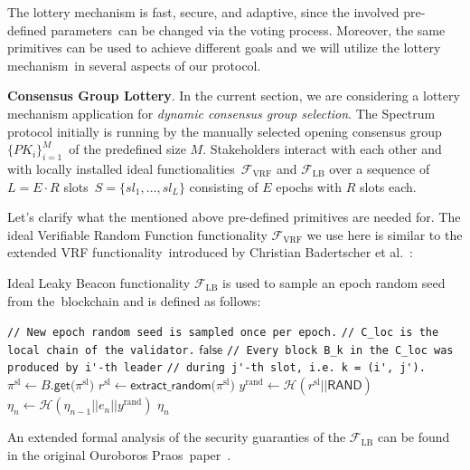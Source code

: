 The lottery mechanism is fast, secure, and adaptive, since the involved pre-defined parameters\
can be changed via the voting process.
Moreover, the same primitives can be used to achieve different goals and we will utilize the lottery mechanism\
in several aspects of our protocol.

\textbf{Consensus Group Lottery}.
In the current section, we are considering a lottery mechanism application for \emph{dynamic consensus group selection}.
The Spectrum protocol initially is running by the manually selected opening consensus group $\{PK_i\}_{i=1}^M$\
of the predefined size $M$.
Stakeholders interact with each other and with locally installed ideal functionalities\
$\mathcal{F}_{\text{VRF}}$ and $\mathcal{F}_{\text{LB}}$ over a sequence of $L = E \cdot R$ slots\
${S=\{sl_1,\dots,sl_L\}}$ consisting of $E$ epochs with $R$ slots each.

Let's clarify what the mentioned above pre-defined primitives are needed for.
The ideal Verifiable Random Function functionality ${\mathcal{F}}_{\text{VRF}}$ we use here is similar to the extended VRF functionality\
introduced by Christian Badertscher et al.~\cite{cryptoeprint:2022/1045}:

Ideal Leaky Beacon functionality $\mathcal{F}_{\text{LB}}$ is used to sample an epoch random seed from the\
blockchain and is defined as follows:
\begin{functionality}
    \caption{${\mathcal{F}_{\text{LB}}(e_n, C_{\text{loc}})}$}
    \begin{algorithmic}
        \State \lstinline|// New epoch random seed is sampled once per epoch.|
        \State \lstinline|// C_loc is the local chain of the validator.|
        \If{${e_n < 2}$}
            \State \Return ${\textsf{false}}$
        \EndIf
            \State \lstinline|// Every block B_k in the C_loc was produced by i'-th leader|
            \State \lstinline|// during j'-th slot, i.e. k = (i', j').|
            \State ${\pi^{\text{sl}} \leftarrow B\textsf{.get(}\pi^{\text{sl}}\textsf{)}}$
            \State ${r^{\text{sl}} \leftarrow \textsf{extract\_random(}\pi^{\text{sl}}\textsf{)}}$
            \State $y^{\text{rand}} \leftarrow \mathcal{H}(r^{\text{sl}} || \textsf{RAND})$
            \State ${\eta_n \leftarrow \mathcal{H}(\eta_{n - 1} || e_n || y^{\text{rand}})}$
        \EndFor
        \State \Return $\eta_n$
    \end{algorithmic}
\end{functionality}
An extended formal analysis of the security guaranties of the ${\mathcal{F}}_{\text{LB}}$ can be found in the original Ouroboros Praos\
paper~\cite{cryptoeprint:2017/573}.

